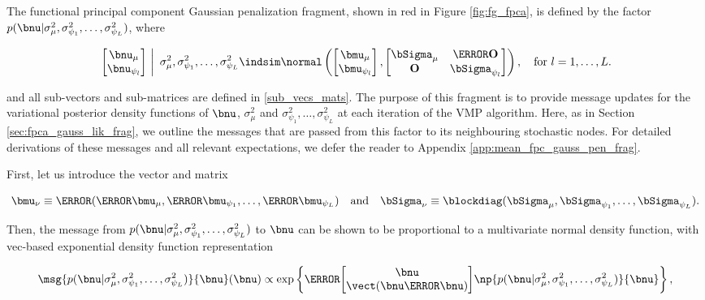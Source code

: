 \documentclass[12pt]{article}
\def\Sigmanu{\bSigma_{\nu}}
\def\munu{\bmu_{\nu}}
\def\sigsqmu{\sigma^2_{\mu}}
\def\mumu{\bmu_\mu}
\def\numu{\bnu_\mu}
\newcommand\nupsi[1]{\bnu_{\psi_{#1}}}
\newcommand\sigsqpsi[1]{\sigma^2_{\psi_{#1}}}
\newcommand\mupsi[1]{\bmu_{\psi_#1}}
\theoremstyle{plain}
\theoremstyle{definition}
\theoremstyle{remark}
\begin{document}
The functional principal component Gaussian penalization fragment,
shown in red in Figure \ref{fig:fg_fpca}, is defined by the factor
$p (\bnu | \sigsqmu, \sigsqpsi{1}, \dots, \sigsqpsi{L})$,  where

\begin{equation}
	\left.\begin{bmatrix}
		\numu \\
		\nupsi{l}
	\end{bmatrix} \ \right| \ \sigsqmu, \sigsqpsi{1}, \dots, \sigsqpsi{L}
		\indsim
			\normal \left(
				\begin{bmatrix}
					\bmu_\mu \\
					\bmu_{\psi_l} \\
				\end{bmatrix},
				\begin{bmatrix}
					\bSigma_\mu & \T{\textbf{O}} \\
					\textbf{O} & \bSigma_{\psi_l}
				\end{bmatrix}
			\right), \quad \text{for $l = 1, \dots, L$.}
\label{mean_fpc_gauss_pen_factor}
\end{equation}

\noindent and all sub-vectors and sub-matrices are defined in \eqref{sub_vecs_mats}. The purpose of
this fragment is to provide message updates for the variational posterior density functions of $\bnu$, $\sigsqmu$
and $\sigsqpsi{1}, \dots, \sigsqpsi{L}$ at each iteration of the VMP algorithm. Here, as in Section
\ref{sec:fpca_gauss_lik_frag}, we outline the messages that are passed from this factor to its neighbouring
stochastic nodes. For detailed derivations of these messages and all relevant expectations, we defer the
reader to Appendix \ref{app:mean_fpc_gauss_pen_frag}.

First, let us introduce the vector and matrix

\begin{equation}
	\munu \equiv \T{(\T{\mumu}, \T{\mupsi{1}}, \dots, \T{\mupsi{L}})} \quad
	\text{and} \quad
	\Sigmanu \equiv \blockdiag (\bSigma_\mu, \bSigma_{\psi_1}, \dots, \bSigma_{\psi_L}).
\label{munu_Sigmanu}
\end{equation}

\noindent Then, the message from $p (\bnu | \sigsqmu, \sigsqpsi{1}, \dots, \sigsqpsi{L})$ to $\bnu$
can be shown to be proportional to a multivariate normal density function, with vec-based exponential density
function representation

\begin{equation}
	\msg{p (\bnu | \sigsqmu, \sigsqpsi{1}, \dots, \sigsqpsi{L})}{\bnu} (\bnu)
		\propto
			\exp \left\{
				\T{\begin{bmatrix}
					\bnu \\
					\vect (\bnu \T{\bnu})
				\end{bmatrix}}
				\np{p (\bnu | \sigsqmu, \sigsqpsi{1}, \dots, \sigsqpsi{L})}{\bnu}
			\right\},
\label{msg_pen_nu}
\end{equation}
\end{document}
